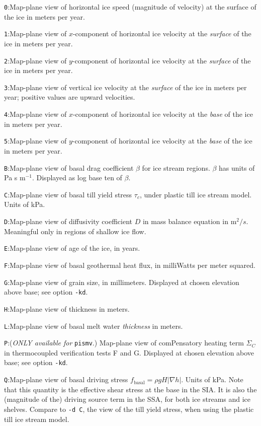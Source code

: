 \documentclass[11pt,final]{amsart}
\renewcommand{\t}[1]{\texttt{#1}}
\newcommand{\grad}{\nabla}
\begin{document}
\verb|0|:\quad Map-plane view of horizontal ice speed (magnitude of velocity) at the surface of the ice in meters per year.

\verb|1|:\quad Map-plane view of $x$-component of horizontal ice velocity at the \emph{surface} of the ice in meters per year.

\verb|2|:\quad Map-plane view of $y$-component of horizontal ice velocity at the \emph{surface} of the ice in meters per year.

\verb|3|:\quad Map-plane view of vertical ice velocity at the \emph{surface} of the ice in meters per year; positive values are upward velocities.

\verb|4|:\quad Map-plane view of $x$-component of horizontal ice velocity at the \emph{base} of the ice in meters per year.

\verb|5|:\quad Map-plane view of $y$-component of horizontal ice velocity at the \emph{base} of the ice in meters per year.

\verb|B|:\quad Map-plane view of basal drag coefficient $\beta$ for ice stream regions.  $\beta$ has units of Pa s $\text{m}^{-1}$.  Displayed as log base ten of $\beta$.

\verb|C|:\quad Map-plane view of basal till yield stress $\tau_c$, under plastic till ice stream model.  Units of kPa.

\verb|D|:\quad \notMat Map-plane view of diffusivity coefficient $D$ in mass balance equation in $\text{m}^2/s$.  Meaningful only in regions of shallow ice flow.

\verb|E|:\quad Map-plane view of age of the ice, in years.

\verb|F|:\quad Map-plane view of basal geothermal heat flux, in milliWatts per meter squared.

\verb|G|:\quad Map-plane view of grain size, in millimeters.  Displayed at chosen elevation above base; see option \verb|-kd|.

\verb|H|:\quad Map-plane view of thickness in meters.

\verb|L|:\quad Map-plane view of basal melt water \emph{thickness} in meters.

\verb|P|:\quad \notMat (\emph{ONLY available for }\t{pismv}.)  Map-plane view of comPensatory heating term $\Sigma_C$ in thermocoupled verification tests F and G.  Displayed at chosen elevation above base; see option \verb|-kd|.

\verb|Q|:\quad Map-plane view of basal driving stress $f_{\text{basal}} = \rho g H |\grad h|$.  Units of kPa.  Note that this quantity is the effective shear stress at the base in the SIA.  It is also the (magnitude of the) driving source term in the SSA, for both ice streams and ice shelves.  Compare to \verb|-d C|, the view of the till yield stress, when using the plastic till ice stream model.
\end{document}
